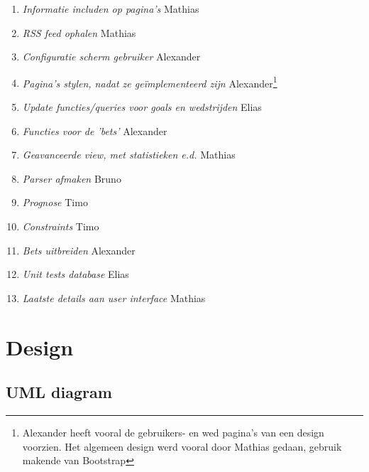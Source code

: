 \documentclass[11pt]{article}
\begin{document}
\begin{enumerate}
        \item \emph{Informatie includen op pagina's} Mathias   

        \item \emph{RSS feed ophalen} Mathias  
        
        \item \emph{Configuratie scherm gebruiker} Alexander     
        
        \item \emph{Pagina's stylen, nadat ze ge\"implementeerd zijn} Alexander\footnote{Alexander heeft vooral de gebruikers- en wed pagina's van een design voorzien. Het algemeen design werd vooral door Mathias gedaan, gebruik makende van Bootstrap}     
        
        \item \emph{Update functies/queries voor goals en wedstrijden} Elias
        
        \item \emph{Functies voor de 'bets'} Alexander

        \item \emph{Geavanceerde view, met statistieken e.d.} Mathias
        
        \item \emph{Parser afmaken} Bruno
        
        \item \emph{Prognose} Timo
        
        \item \emph{Constraints} Timo
        
        \item \emph{Bets uitbreiden} Alexander
        
        \item \emph{Unit tests database} Elias
        
        \item \emph{Laatste details aan user interface} Mathias
    
    \end{enumerate}




\section{Design}


\subsection{UML diagram}
\end{document}
